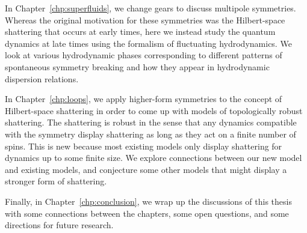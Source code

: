 In Chapter~\ref{chp:superfluids}, we change gears to discuss multipole symmetries. Whereas the original motivation for these symmetries was the Hilbert-space shattering that occurs at early times, here we instead study the quantum dynamics at late times using the formalism of fluctuating hydrodynamics. We look at various hydrodynamic phases corresponding to different patterns of spontaneous symmetry breaking and how they appear in hydrodynamic dispersion relations. 

In Chapter~\ref{chp:loops}, we apply higher-form symmetries to the concept of Hilbert-space shattering in order to come up with models of topologically robust shattering. The shattering is robust in the sense that any dynamics compatible with the symmetry display shattering as long as they act on a finite number of spins. This is new because most existing models only display shattering for dynamics up to some finite size. We explore connections between our new model and existing models, and conjecture some other models that might display a stronger form of shattering.

Finally, in Chapter~\ref{chp:conclusion}, we wrap up the discussions of this thesis with some connections between the chapters, some open questions, and some directions for future research.